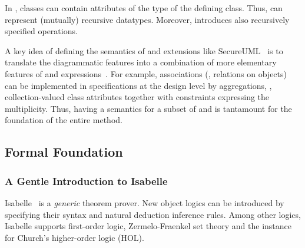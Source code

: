 In \UML, classes can contain attributes of the type of the
defining class.  Thus, \UML can represent (mutually) recursive
datatypes. Moreover, \OCL introduces also recursively specified
operations.

A key idea of defining the semantics of \UML and extensions like
SecureUML~\cite{brucker.ea:transformation:2006} is to translate the
diagrammatic \UML features into a combination of more elementary
features of \UML and \OCL
expressions~\cite{gogolla.ea:expressing:2001}. For example,
associations (\ie, relations on objects) can be implemented in
specifications at the design level by aggregations, \ie, collection-valued 
class attributes together with \OCL constraints expressing the
multiplicity. Thus, having a semantics for a subset of \UML and \OCL is
tantamount for the foundation of the entire method.
\endisatagafp



\subsection{Formal Foundation}

\subsubsection{A Gentle Introduction to Isabelle}
Isabelle~\cite{nipkow.ea:isabelle:2002} is a \emph{generic} theorem
prover. New object logics can be introduced by specifying their syntax
and natural deduction inference rules. Among other logics, Isabelle
supports first-order logic, Zermelo-Fraenkel set theory and the
instance for Church's higher-order logic (HOL).

